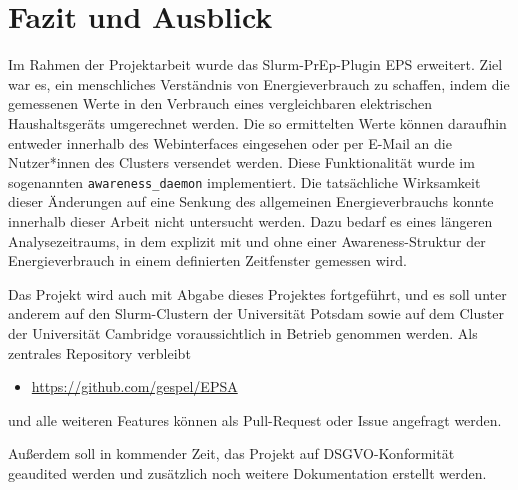 \documentclass[paper=a4, fontsize=11pt]{scrartcl} %
\numberwithin{equation}{section} %
\numberwithin{figure}{section} %
\numberwithin{table}{section} %
\begin{document}
\section{Fazit und Ausblick}
Im Rahmen der Projektarbeit wurde das Slurm-PrEp-Plugin EPS erweitert. Ziel war es, ein menschliches Verständnis von Energieverbrauch zu schaffen, indem die gemessenen Werte in den Verbrauch eines vergleichbaren elektrischen Haushaltsgeräts umgerechnet werden. Die so ermittelten Werte können daraufhin entweder innerhalb des Webinterfaces eingesehen oder per E-Mail an die Nutzer*innen des Clusters versendet werden. Diese Funktionalität wurde im sogenannten \texttt{awareness\_daemon} implementiert. Die tatsächliche Wirksamkeit dieser Änderungen auf eine Senkung des allgemeinen Energieverbrauchs konnte innerhalb dieser Arbeit nicht untersucht werden. Dazu bedarf es eines längeren Analysezeitraums, in dem explizit mit und ohne einer Awareness-Struktur der Energieverbrauch in einem definierten Zeitfenster gemessen wird.

Das Projekt wird auch mit Abgabe dieses Projektes fortgeführt, und es soll unter anderem auf den Slurm-Clustern der Universität Potsdam sowie auf dem Cluster der Universität Cambridge voraussichtlich in Betrieb genommen werden. Als zentrales Repository verbleibt
\begin{itemize}
    \item \href{https://github.com/gespel/EPSA}{https://github.com/gespel/EPSA} 
\end{itemize}
und alle weiteren Features können als Pull-Request oder Issue angefragt werden.

Außerdem soll in kommender Zeit, das Projekt auf DSGVO-Konformität geaudited werden und zusätzlich noch weitere Dokumentation erstellt werden.
\newpage
\printbibliography
\end{document}
